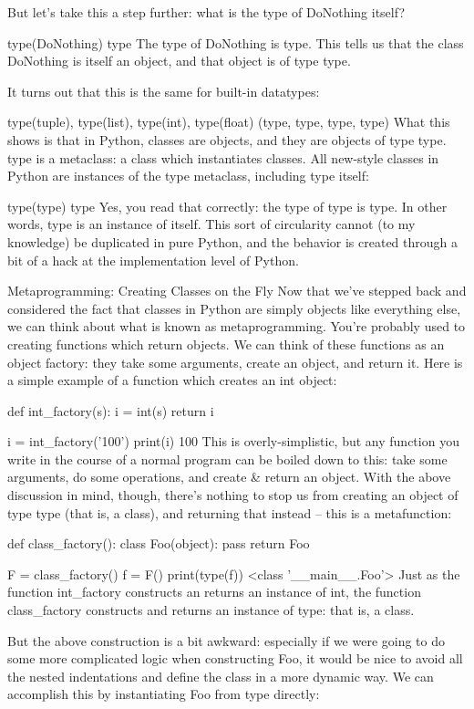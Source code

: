 But let's take this a step further: what is the type of DoNothing itself?

type(DoNothing)
type
The type of DoNothing is type. This tells us that the class DoNothing is itself an object, and that object is of type type.

It turns out that this is the same for built-in datatypes:

type(tuple), type(list), type(int), type(float)
(type, type, type, type)
What this shows is that in Python, classes are objects, and they are objects of type type.  type is a metaclass: a class which instantiates classes. All new-style classes in Python are instances of the type metaclass, including type itself:

type(type)
type
Yes, you read that correctly: the type of type is type. In other words, type is an instance of itself. This sort of circularity cannot (to my knowledge) be duplicated in pure Python, and the behavior is created through a bit of a hack at the implementation level of Python.

Metaprogramming: Creating Classes on the Fly
Now that we've stepped back and considered the fact that classes in Python are simply objects like everything else, we can think about what is known as metaprogramming. You're probably used to creating functions which return objects. We can think of these functions as an object factory: they take some arguments, create an object, and return it. Here is a simple example of a function which creates an int object:

def int_factory(s):
    i = int(s)
    return i

i = int_factory('100')
print(i)
100
This is overly-simplistic, but any function you write in the course of a normal program can be boiled down to this: take some arguments, do some operations, and create & return an object. With the above discussion in mind, though, there's nothing to stop us from creating an object of type type (that is, a class), and returning that instead -- this is a metafunction:

def class_factory():
    class Foo(object):
        pass
    return Foo

F = class_factory()
f = F()
print(type(f))
<class '__main__.Foo'>
Just as the function int_factory constructs an returns an instance of int, the function class_factory constructs and returns an instance of type: that is, a class.

But the above construction is a bit awkward: especially if we were going to do some more complicated logic when constructing Foo, it would be nice to avoid all the nested indentations and define the class in a more dynamic way. We can accomplish this by instantiating Foo from type directly:


